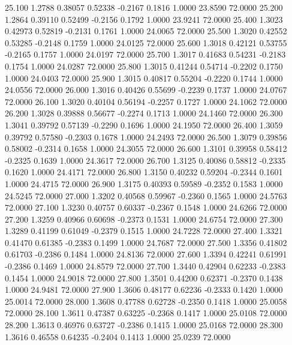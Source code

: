   25.100   1.2788   0.38057   0.52338  -0.2167   0.1816   1.0000  23.8590  72.0000
  25.200   1.2864   0.39110   0.52499  -0.2156   0.1792   1.0000  23.9241  72.0000
  25.400   1.3023   0.42973   0.52819  -0.2131   0.1761   1.0000  24.0065  72.0000
  25.500   1.3020   0.42552   0.53285  -0.2148   0.1759   1.0000  24.0125  72.0000
  25.600   1.3018   0.42121   0.53755  -0.2165   0.1757   1.0000  24.0197  72.0000
  25.700   1.3017   0.41683   0.54231  -0.2183   0.1754   1.0000  24.0287  72.0000
  25.800   1.3015   0.41244   0.54714  -0.2202   0.1750   1.0000  24.0403  72.0000
  25.900   1.3015   0.40817   0.55204  -0.2220   0.1744   1.0000  24.0556  72.0000
  26.000   1.3016   0.40426   0.55699  -0.2239   0.1737   1.0000  24.0767  72.0000
  26.100   1.3020   0.40104   0.56194  -0.2257   0.1727   1.0000  24.1062  72.0000
  26.200   1.3028   0.39888   0.56677  -0.2274   0.1713   1.0000  24.1460  72.0000
  26.300   1.3041   0.39792   0.57139  -0.2290   0.1696   1.0000  24.1950  72.0000
  26.400   1.3059   0.39792   0.57580  -0.2303   0.1678   1.0000  24.2493  72.0000
  26.500   1.3079   0.39856   0.58002  -0.2314   0.1658   1.0000  24.3055  72.0000
  26.600   1.3101   0.39958   0.58412  -0.2325   0.1639   1.0000  24.3617  72.0000
  26.700   1.3125   0.40086   0.58812  -0.2335   0.1620   1.0000  24.4171  72.0000
  26.800   1.3150   0.40232   0.59204  -0.2344   0.1601   1.0000  24.4715  72.0000
  26.900   1.3175   0.40393   0.59589  -0.2352   0.1583   1.0000  24.5245  72.0000
  27.000   1.3202   0.40568   0.59967  -0.2360   0.1565   1.0000  24.5763  72.0000
  27.100   1.3230   0.40757   0.60337  -0.2367   0.1548   1.0000  24.6266  72.0000
  27.200   1.3259   0.40966   0.60698  -0.2373   0.1531   1.0000  24.6754  72.0000
  27.300   1.3289   0.41199   0.61049  -0.2379   0.1515   1.0000  24.7228  72.0000
  27.400   1.3321   0.41470   0.61385  -0.2383   0.1499   1.0000  24.7687  72.0000
  27.500   1.3356   0.41802   0.61703  -0.2386   0.1484   1.0000  24.8136  72.0000
  27.600   1.3394   0.42241   0.61991  -0.2386   0.1469   1.0000  24.8579  72.0000
  27.700   1.3440   0.42904   0.62233  -0.2383   0.1454   1.0000  24.9018  72.0000
  27.800   1.3501   0.44200   0.62371  -0.2370   0.1438   1.0000  24.9481  72.0000
  27.900   1.3606   0.48177   0.62236  -0.2333   0.1420   1.0000  25.0014  72.0000
  28.000   1.3608   0.47788   0.62728  -0.2350   0.1418   1.0000  25.0058  72.0000
  28.100   1.3611   0.47387   0.63225  -0.2368   0.1417   1.0000  25.0108  72.0000
  28.200   1.3613   0.46976   0.63727  -0.2386   0.1415   1.0000  25.0168  72.0000
  28.300   1.3616   0.46558   0.64235  -0.2404   0.1413   1.0000  25.0239  72.0000
